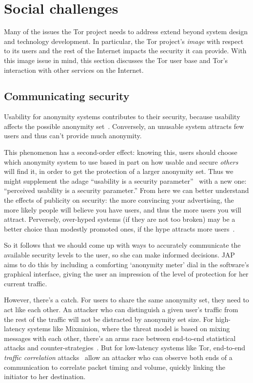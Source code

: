 \documentclass{llncs}
\begin{document}
\section{Social challenges}

Many of the issues the Tor project needs to address extend beyond
system design and technology development. In particular, the
Tor project's \emph{image} with respect to its users and the rest of
the Internet impacts the security it can provide.
With this image issue in mind, this section discusses the Tor user base and
Tor's interaction with other services on the Internet.

\subsection{Communicating security}

Usability for anonymity systems
contributes to their security, because usability
affects the possible anonymity set~\cite{econymics,back01}.
Conversely, an unusable system attracts few users and thus can't provide
much anonymity.

This phenomenon has a second-order effect: knowing this, users should
choose which anonymity system to use based in part on how usable
and secure
\emph{others} will find it, in order to get the protection of a larger
anonymity set. Thus we might supplement the adage ``usability is a security
parameter''~\cite{back01} with a new one: ``perceived usability is a
security parameter.'' From here we can better understand the effects
of publicity on security: the more convincing your
advertising, the more likely people will believe you have users, and thus
the more users you will attract. Perversely, over-hyped systems (if they
are not too broken) may be a better choice than modestly promoted ones,
if the hype attracts more users~\cite{usability-network-effect}.

So it follows that we should come up with ways to accurately communicate
the available security levels to the user, so she can make informed
decisions. JAP aims to do this by including a
comforting `anonymity meter' dial in the software's graphical interface,
giving the user an impression of the level of protection for her current
traffic.

However, there's a catch. For users to share the same anonymity set,
they need to act like each other. An attacker who can distinguish
a given user's traffic from the rest of the traffic will not be
distracted by anonymity set size. For high-latency systems like
Mixminion, where the threat model is based on mixing messages with each
other, there's an arms race between end-to-end statistical attacks and
counter-strategies~\cite{statistical-disclosure,minion-design,e2e-traffic,trickle02}.
But for low-latency systems like Tor, end-to-end \emph{traffic
correlation} attacks~\cite{danezis-pet2004,defensive-dropping,SS03}
allow an attacker who can observe both ends of a communication
to correlate packet timing and volume, quickly linking
the initiator to her destination.
\end{document}
